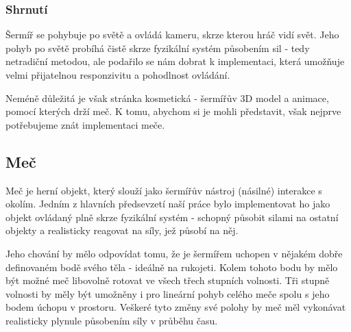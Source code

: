 \subsubsection*{Shrnutí}

Šermíř se pohybuje po světě a ovládá kameru, skrze kterou hráč vidí svět. Jeho pohyb po světě probíhá čistě skrze fyzikální systém působením sil - tedy netradiční metodou, ale podařilo se nám dobrat k implementaci, která umožňuje velmi přijatelnou responzivitu a pohodlnost ovládání. 

Neméně důležitá je však stránka kosmetická - šermířův 3D model a animace, pomocí kterých drží meč. K tomu, abychom si je mohli představit, však nejprve potřebujeme znát implementaci meče. 






\subsection{Meč}

Meč je herní objekt, který slouží jako šermířův nástroj (násilné) interakce s okolím. Jedním z hlavních předsevzetí naší práce bylo implementovat ho jako objekt ovládaný plně skrze fyzikální systém - schopný působit silami na ostatní objekty a realisticky reagovat na síly, jež působí na něj.

Jeho chování by mělo odpovídat tomu, že je šermířem uchopen v nějakém dobře definovaném bodě svého těla - ideálně na rukojeti. Kolem tohoto bodu by mělo být možné meč libovolně rotovat ve všech třech stupních volnosti. Tři stupně volnosti by měly být umožněny i pro lineární pohyb celého meče spolu s jeho bodem úchopu v prostoru. Veškeré tyto změny své polohy by meč měl vykonávat realisticky plynule působením síly v průběhu času.

